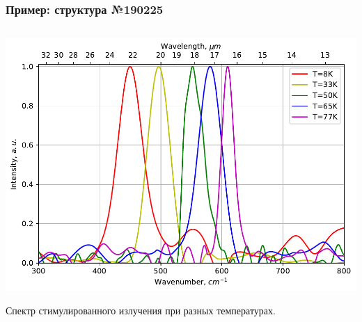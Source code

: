 \documentclass[9pt,pdf]{beamer}
\begin{document}
    \begin{frame}
        \frametitle{Пример: структура №190225}
        \begin{columns}
            \begin{column}{0.7\textwidth}
                \begin{overprint}
                    \begin{center}
                        \includegraphics[width=\textwidth]{images/22um_spectre.pdf}
                    \end{center}
                    Спектр стимулированного излучения при разных температурах.


\end{overprint}
\end{column}
\end{columns}
\end{frame}
\end{document}
